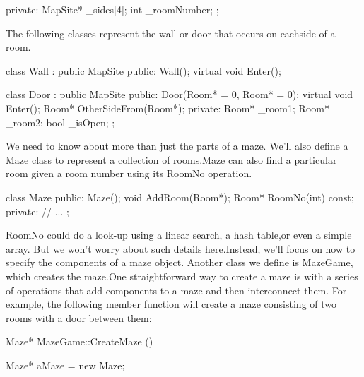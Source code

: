\documentclass{report}
\begin{document}
\begin{itemize}
\begin{cppcode}
{                private:
                    MapSite* _sides[4];
                    int _roomNumber;
                };
            \end{cppcode}
            \bigbreak \noindent 
            The following classes represent the wall or door that occurs on eachside of a room.
            \bigbreak \noindent 
            \begin{cppcode}
                class Wall : public MapSite {
                public:
                    Wall();
                    virtual void Enter();
                }
            \end{cppcode}
            \bigbreak \noindent 
            \begin{cppcode}
                class Door : public MapSite {
                public:
                    Door(Room* = 0, Room* = 0);
                    virtual void Enter();
                    Room* OtherSideFrom(Room*);
                private:
                    Room* _room1;
                    Room* _room2;
                    bool _isOpen;
                };
            \end{cppcode}
            \bigbreak \noindent 
            We need to know about more than just the parts of a maze. We'll also define a Maze class to represent a collection of rooms.Maze can also find a particular room given a room number using its RoomNo operation.
            \bigbreak \noindent 
            \begin{cppcode}
                class Maze {
                public:
                    Maze();
                    void AddRoom(Room*);
                    Room* RoomNo(int) const;
                private:
                    // ...
                };
            \end{cppcode}
            \bigbreak \noindent 
            RoomNo could do a look-up using a linear search, a hash table,or even a simple array. But we won't worry about such details here.Instead, we'll focus on how to specify the components of a maze object.
            \bigbreak \noindent 
            Another class we define is MazeGame, which creates the maze.One straightforward way to create a maze is with a series of operations that add components to a maze and then interconnect them. For example, the following member function will create a maze consisting of two rooms with a door between them:
            \bigbreak \noindent 
            \begin{cppcode}
                Maze* MazeGame::CreateMaze () {
                    Maze* aMaze = new Maze;

}
\end{cppcode}
\end{itemize}
\end{document}
